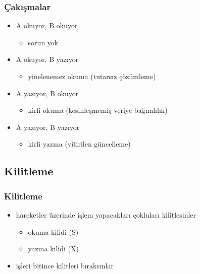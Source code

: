 \documentclass[dvipsnames]{beamer}
\theoremstyle{definition}
\theoremstyle{example}
\theoremstyle{plain}
\begin{document}
\begin{frame}
  \frametitle{Çakışmalar}

  \begin{itemize}
    \item A okuyor, B okuyor
    \begin{itemize}
      \item sorun yok
    \end{itemize}

    \pause
    \item A okuyor, B yazıyor
    \begin{itemize}
      \item yinelenemez okuma (tutarsız çözümleme)
    \end{itemize}

    \pause
    \item A yazıyor, B okuyor
    \begin{itemize}
      \item kirli okuma (kesinleşmemiş veriye bağımlılık)
    \end{itemize}

    \pause
    \item A yazıyor, B yazıyor
    \begin{itemize}
      \item kirli yazma (yitirilen güncelleme)
    \end{itemize}
  \end{itemize}
\end{frame}

\subsection{Kilitleme}

\begin{frame}
  \frametitle{Kilitleme}

  \begin{itemize}
    \item hareketler üzerinde işlem yapacakları çokluları kilitlesinler
    \begin{itemize}
      \item okuma kilidi (S)
      \item yazma kilidi (X)
    \end{itemize}

    \item işleri bitince kilitleri bıraksınlar
  \end{itemize}
\end{frame}
\end{document}
